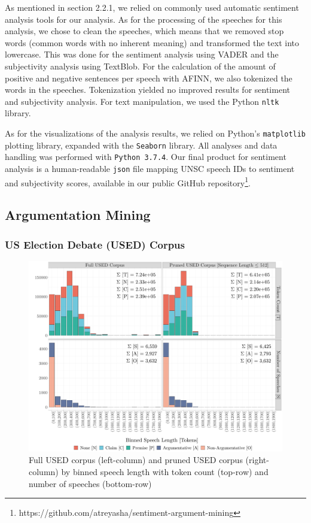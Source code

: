 As mentioned in section 2.2.1, we relied on commonly used automatic sentiment analysis tools for our analysis.  As for the processing of the speeches for this analysis, we chose to clean the speeches, which means that we removed stop words (common words with no inherent meaning) and transformed the text into lowercase. This was done for the sentiment analysis using VADER and the subjectivity analysis using TextBlob. For the calculation of the amount of positive and negative sentences per speech with AFINN, we also tokenized the words in the speeches. Tokenization yielded no improved results for sentiment and subjectivity analysis. For text manipulation, we used the Python \texttt{nltk} library.

As for the visualizations of the analysis results, we relied on Python's \texttt{matplotlib} plotting library, expanded with the \texttt{Seaborn} library. All analyses and data handling was performed with \texttt{Python 3.7.4}.  Our final product for sentiment analysis is a human-readable \texttt{json} file mapping UNSC speech IDs to sentiment and subjectivity scores, available in our public GitHub repository\footnote{https://github.com/atreyasha/sentiment-argument-mining}.

\subsection{Argumentation Mining}
\subsubsection{US Election Debate (USED) Corpus}
\label{used}

\begin{figure}[b!]
    \centering
    \includegraphics[trim={1.0cm 0cm 0cm 0cm},clip,width=\textwidth]{img/token_dist_US_length_combined.pdf}
    \caption{Full USED corpus (left-column) and pruned USED corpus (right-column) by binned speech length with token count (top-row) and number of speeches (bottom-row)}
    \label{used_distribution_combined}
\end{figure}

